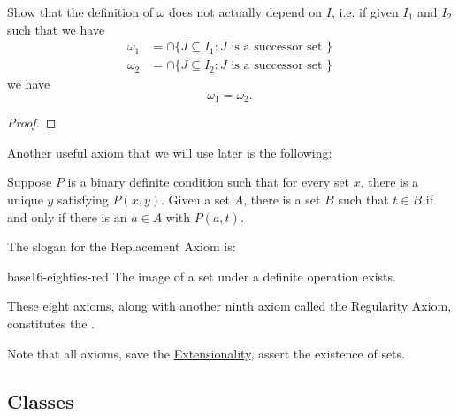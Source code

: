 \documentclass[notoc,notitlepage]{tufte-book}
\begin{document}
\begin{ex}
  Show that the definition of $\omega$ does not actually depend on $I$, i.e. if given $I_1$ and $I_2$ such that we have
  \begin{align*}
    \omega_1 &= \cap \{ J \subseteq I_1 : J \text{ is a successor set } \} \\
    \omega_2 &= \cap \{ J \subseteq I_2 : J \text{ is a successor set } \}
  \end{align*}
  we have
  \begin{equation*}
    \omega_1 = \omega_2.
  \end{equation*}
\end{ex}

\begin{proof}
\end{proof}

Another useful axiom that we will use later is the following:

\begin{axiom}
\label{axiom:replacement_axiom}
  Suppose $P$ is a binary definite condition such that for every set $x$, there is a unique $y$ satisfying $P(x, y)$. Given a set $A$, there is a set $B$ such that $t \in B$ if and only if there is an $a \in A$ with $P(a, t)$.
\end{axiom}

\begin{note}
  The slogan for the Replacement Axiom is:
  \begin{quotebox}{base16-eighties-red}
    The image of a set under a definite operation exists.
  \end{quotebox}
\end{note}

These eight axioms, along with another ninth axiom called the Regularity Axiom, constitutes the .

Note that all axioms, save the \hyperref[axiom:axiom_of_extension]{Extensionality}, assert the existence of sets.


\subsection{Classes}%
\label{sub:classes}
\end{document}

